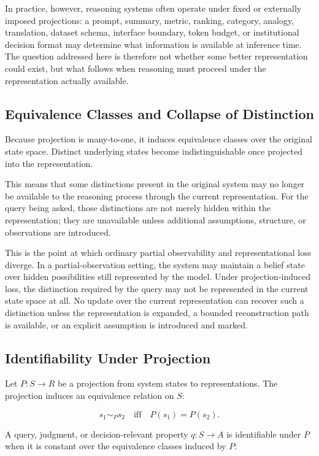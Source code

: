 \documentclass[11pt]{article}
\begin{document}
In practice, however, reasoning systems often operate under fixed or externally imposed projections: a prompt, summary, metric, ranking, category, analogy, translation, dataset schema, interface boundary, token budget, or institutional decision format may determine what information is available at inference time. The question addressed here is therefore not whether some better representation could exist, but what follows when reasoning must proceed under the representation actually available.

\subsection{Equivalence Classes and Collapse of Distinction}

Because projection is many-to-one, it induces equivalence classes over the original state space. Distinct underlying states become indistinguishable once projected into the representation.

This means that some distinctions present in the original system may no longer be available to the reasoning process through the current representation. For the query being asked, those distinctions are not merely hidden within the representation; they are unavailable unless additional assumptions, structure, or observations are introduced.

This is the point at which ordinary partial observability and representational loss diverge. In a partial-observation setting, the system may maintain a belief state over hidden possibilities still represented by the model. Under projection-induced loss, the distinction required by the query may not be represented in the current state space at all. No update over the current representation can recover such a distinction unless the representation is expanded, a bounded reconstruction path is available, or an explicit assumption is introduced and marked.

\subsection{Identifiability Under Projection}

Let $P:S\rightarrow R$ be a projection from system states to representations. The projection induces an equivalence relation on $S$:

\[
s_1 \sim_P s_2 \quad \text{iff} \quad P(s_1)=P(s_2).
\]

A query, judgment, or decision-relevant property $q:S\rightarrow A$ is identifiable under $P$ when it is constant over the equivalence classes induced by $P$:
\end{document}
